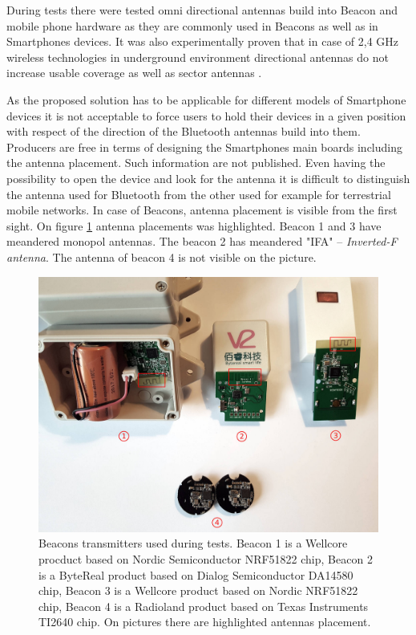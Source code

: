 \documentclass[../main.tex]{subfiles}
\begin{document}
During tests there were tested omni directional antennas build into Beacon and mobile phone hardware as they are commonly used in Beacons as well as in Smartphones devices. It was also experimentally proven that in case of 2,4 GHz wireless technologies in underground environment directional antennas do not increase usable coverage as well as sector antennas \cite{Thesis_CM}.

As the proposed solution has to be applicable for different models of Smartphone devices it is not acceptable to force users to hold their devices in a given position with respect of the direction of the Bluetooth antennas build into them. Producers are free in terms of designing the Smartphones main boards including the antenna placement. Such information are not published. Even having the possibility to open the device and look for the antenna it is difficult to distinguish the antenna used for Bluetooth from the other used for example for terrestrial mobile networks. In case of Beacons, antenna placement is visible from the first sight. On figure \ref{fig:beacons_used_in_tests} antenna placements was highlighted. Beacon 1 and 3 have meandered monopol antennas. The beacon 2 has meandered "IFA" -- \textit{Inverted-F antenna}. The antenna of beacon 4 is not visible on the picture.

\begin{figure}[!htbp]
\includegraphics[width=\textwidth, keepaspectratio]{pictures/beacons_used_in_tests.pdf}
\centering
\caption{Beacons transmitters used during tests. Beacon 1 is a Wellcore procduct based on Nordic Semiconductor NRF51822 chip, Beacon 2 is a ByteReal product based on Dialog Semiconductor DA14580 chip, Beacon 3 is a Wellcore product based on Nordic NRF51822 chip, Beacon 4 is a Radioland product based on Texas Instruments TI2640 chip. On pictures there are highlighted antennas placement.}
\label{fig:beacons_used_in_tests}
\end{figure}
\end{document}
